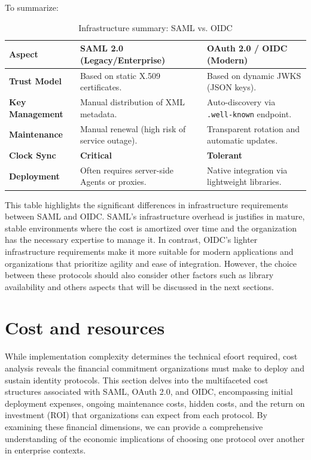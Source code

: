 \documentclass[../memoire.tex]{subfiles}
\begin{document}
To summarize:
\begin{table}[H]
    \centering
    \label{tab:infrastructure_comparison}
    \begin{tabularx}{\textwidth}{@{} l | X X @{}}
        \textbf{Aspect} & \textbf{SAML 2.0 (Legacy/Enterprise)} & \textbf{OAuth 2.0 / OIDC (Modern)} \\ \hline
        \textbf{Trust Model} & Based on static X.509 certificates. & Based on dynamic JWKS (JSON keys). \\
        \textbf{Key Management} & Manual distribution of XML metadata. & Auto-discovery via \texttt{.well-known} endpoint. \\
        \textbf{Maintenance} & Manual renewal (high risk of service outage). & Transparent rotation and automatic updates. \\
        \textbf{Clock Sync} & \textbf{Critical} & \textbf{Tolerant} \\
        \textbf{Deployment} & Often requires server-side Agents or proxies. & Native integration via lightweight libraries. \\
    \end{tabularx}
    \caption{Infrastructure summary: SAML vs. OIDC}
\end{table}

This table highlights the significant differences in infrastructure requirements between SAML and OIDC. SAML's infrastructure overhead is justifies in mature, stable environments where the cost is amortized over time and the organization has the necessary expertise to manage it. In contrast, OIDC's lighter infrastructure requirements make it more suitable for modern applications and organizations that prioritize agility and ease of integration. However, the choice between these protocols should also consider other factors such as library availability and others aspects that will be discussed in the next sections.

\section{Cost and resources}

While implementation complexity determines the technical efoort required, cost analysis reveals the financial commitment organizations must make to deploy and sustain identity protocols. This section delves into the multifaceted cost structures associated with SAML, OAuth 2.0, and OIDC, encompassing initial deployment expenses, ongoing maintenance costs, hidden costs, and the return on investment (ROI) that organizations can expect from each protocol. By examining these financial dimensions, we can provide a comprehensive understanding of the economic implications of choosing one protocol over another in enterprise contexts.
\end{document}
